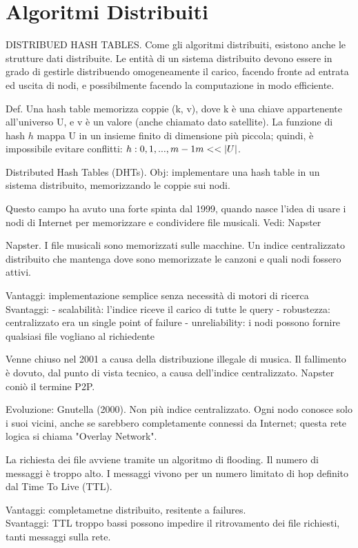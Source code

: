 \section{Algoritmi Distribuiti}

DISTRIBUED HASH TABLES.
Come gli algoritmi distribuiti, esistono anche le strutture dati distribuite.
Le entità di un sistema distribuito devono essere in grado di gestirle distribuendo omogeneamente il carico, facendo fronte ad entrata
ed uscita di nodi, e possibilmente facendo la computazione in modo efficiente.

Def. Una hash table memorizza coppie (k, v), dove k è una chiave appartenente all'universo U, e v è un valore (anche chiamato dato
satellite). La funzione di hash $h$ mappa U in un insieme finito di dimensione più piccola; quindi, è impossibile evitare conflitti:
$h : {0, 1, ..., m-1} \space m << |U|$.

Distributed Hash Tables (DHTs).
Obj: implementare una hash table in un sistema distribuito, memorizzando le coppie sui nodi.

Questo campo ha avuto una forte spinta dal 1999, quando nasce l'idea di usare i nodi di Internet per memorizzare e condividere file musicali.
Vedi: Napster

Napster. I file musicali sono memorizzati sulle macchine. Un indice centralizzato distribuito che mantenga dove sono memorizzate le canzoni
e quali nodi fossero attivi.

Vantaggi: implementazione semplice senza necessità di motori di ricerca
Svantaggi:
 - scalabilità: l'indice riceve il carico di tutte le query
 - robustezza: centralizzato era un single point of failure
 - unreliability: i nodi possono fornire qualsiasi file vogliano al richiedente

Venne chiuso nel 2001 a causa della distribuzione illegale di musica. Il fallimento è dovuto, dal punto di vista tecnico, a causa dell'indice
centralizzato. Napster coniò il termine P2P.

Evoluzione: Gnutella (2000). Non più indice centralizzato. Ogni nodo conosce solo i suoi vicini, anche se sarebbero completamente connessi
da Internet; questa rete logica si chiama "Overlay Network".

La richiesta dei file avviene tramite un algoritmo di flooding. Il numero di messaggi è troppo alto. I messaggi vivono per un numero limitato
di hop definito dal Time To Live (TTL).

Vantaggi: completametne distribuito, resitente a failures. \\
Svantaggi: TTL troppo bassi possono impedire il ritrovamento dei file richiesti, tanti messaggi sulla rete. \\

